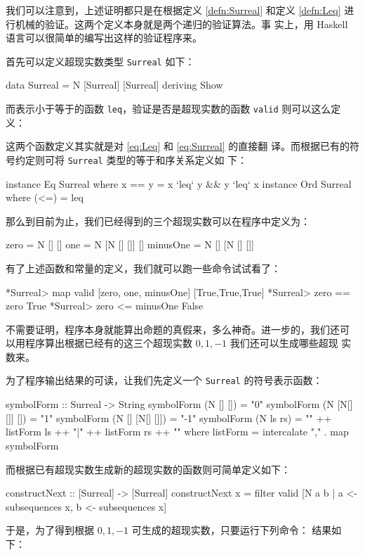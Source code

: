 \documentclass[cs4size,a4paper,adobefonts]{ctexart}
\numberwithin{equation}{section}
\begin{document}
我们可以注意到，上述证明都只是在根据定义 \ref{defn:Surreal} 和定义
\ref{defn:Leq} 进行机械的验证。这两个定义本身就是两个递归的验证算法。事
实上，用 Haskell 语言可以很简单的编写出这样的验证程序来。

首先可以定义超现实数类型 \verb|Surreal| 如下：
\begin{code}
data Surreal = N [Surreal] [Surreal] deriving Show
\end{code}
而表示小于等于的函数 \verb|leq|，验证是否是超现实数的函数 \verb|valid|
则可以这么定义：


这两个函数定义其实就是对 \eqref{eq:Leq} 和 \eqref{eq:Surreal} 的直接翻
译。而根据已有的符号约定则可将 \verb|Surreal| 类型的等于和序关系定义如
下：
\begin{code}
instance Eq Surreal where
  x == y = x `leq` y && y `leq` x
instance Ord Surreal where
  (<=) = leq
\end{code}
那么到目前为止，我们已经得到的三个超现实数可以在程序中定义为：
\begin{code}
zero = N [] []
one = N [N [] []] []
minusOne = N [] [N [] []]
\end{code}

有了上述函数和常量的定义，我们就可以跑一些命令试试看了：
\begin{code}
*Surreal> map valid [zero, one, minusOne]
[True,True,True]
*Surreal> zero == zero
True
*Surreal> zero <= minusOne
False
\end{code}
不需要证明，程序本身就能算出命题的真假来，多么神奇。进一步的，我们还可
以用程序算出根据已经有的这三个超现实数 $0,1,-1$ 我们还可以生成哪些超现
实数来。

为了程序输出结果的可读，让我们先定义一个 \verb|Surreal| 的符号表示函数：
\begin{code}
symbolForm :: Surreal -> String
symbolForm (N [] []) = "0"
symbolForm (N [N[] []] []) = "1"
symbolForm (N [] [N[] []]) = "-1"
symbolForm (N ls rs) = "{" ++ listForm ls ++ "|" ++ listForm rs ++ "}"
  where listForm = intercalate "," . map symbolForm
\end{code}
而根据已有超现实数生成新的超现实数的函数则可简单定义如下：
\begin{code}
constructNext :: [Surreal] -> [Surreal]
constructNext x = filter valid [N a b | a <- subsequences x, 
                                b <- subsequences x]
\end{code}
于是，为了得到根据 $0,1,-1$ 可生成的超现实数，只要运行下列命令：
结果如下：
\begin{code}
["0","{|-1}","-1","{|-1,0}","{|1}","{|-1,1}","{|0,1}","{|-1,0,1}",
"{-1|}","{-1|0}","{-1|1}","{-1|0,1}","1","{0|1}","{-1,0|}",
"{-1,0|1}","{1|}","{-1,1|}","{0,1|}","{-1,0,1|}"]
\end{code}
\end{document}
